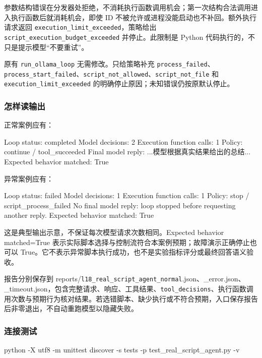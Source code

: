 参数结构错误在分发器处拒绝，不消耗执行函数调用机会；第一次结构合法调用进入执行函数后就消耗机会，即使 ID 不被允许或进程没能启动也不补回。额外执行请求返回 \nolinkurl{execution_limit_exceeded}，策略给出 \nolinkurl{script_execution_budget_exceeded} 并停止。此限制是 Python 代码执行的，不只是提示模型“不要重试”。

原有 \nolinkurl{run_ollama_loop} 无需修改。只给策略补充 \nolinkurl{process_failed}、\nolinkurl{process_start_failed}、\nolinkurl{script_not_allowed}、\nolinkurl{script_not_file} 和 \nolinkurl{execution_limit_exceeded} 的明确停止原因；未知错误仍按原默认停止。

\subsubsection{怎样读输出}

正常案例应有：

\begin{Code}
Loop status: completed
Model decisions: 2
Execution function calls: 1
Policy: continue / tool_succeeded
Final model reply: ...模型根据真实结果给出的总结...
Expected behavior matched: True
\end{Code}

异常案例应有：

\begin{Code}
Loop status: failed
Model decisions: 1
Execution function calls: 1
Policy: stop / script_process_failed
No final model reply: loop stopped before requesting another reply.
Expected behavior matched: True
\end{Code}

这是典型输出示意，不保证每次模型请求次数相同。Expected behavior matched=True 表示实际脚本选择与控制流符合本案例预期；故障演示正确停止也可以 True。它不表示异常脚本执行成功，也不是实验指标评分或最终回答语义验收。

报告分别保存到 reports/\nolinkurl{l18_real_script_agent_normal}.json、\_error.json、\_timeout.json，包含完整请求、响应、工具结果、\nolinkurl{tool_decisions}、执行函数调用次数与预期行为核对结果。若选错脚本、缺少执行或不符合预期，入口保存报告后非零退出，不自动重跑模型以隐藏失败。

\subsubsection{连接测试}

\begin{Code}
python -X utf8 -m unittest discover -s tests -p test_real_script_agent.py -v
\end{Code}

